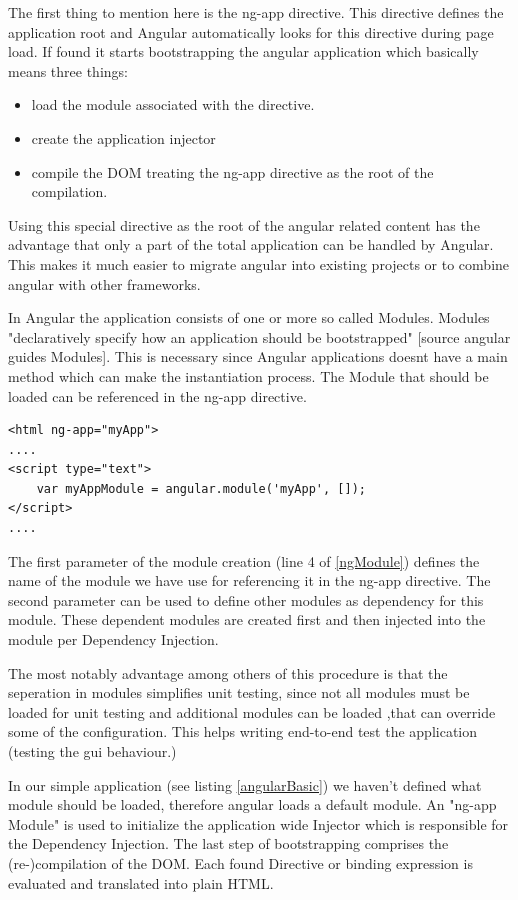 The first thing to mention here is the ng-app directive. This directive defines the application root and Angular automatically looks for this directive during page load. If found it starts bootstrapping the angular application which basically means three things:
\begin{itemize}
	\item load the module associated with the directive.
	\item create the application injector
	\item compile the DOM treating the ng-app directive as the root of the compilation. 
\end{itemize}

Using this special directive as the root of the angular related content has the advantage that only a part of the total application can be handled by Angular. This makes it much easier to migrate angular into existing projects or to combine angular with other frameworks.

In Angular the application consists of one or more so called Modules. Modules "declaratively specify how an application should be bootstrapped" [source angular guides Modules]. This is necessary since Angular applications doesnt have a main method which can make the instantiation process. The Module that should be loaded can be referenced in the ng-app directive. 
\begin{lstlisting}[label=ngModule]
<html ng-app="myApp">
....
<script type="text">
	var myAppModule = angular.module('myApp', []);
</script>
....
\end{lstlisting}

The first parameter of the module creation (line 4 of \ref{ngModule}) defines the name of the module we have use for referencing it in the ng-app directive. The second parameter can be used to define other modules as dependency for this module. These dependent modules are created first and then injected into the module per Dependency Injection.


The most notably advantage among others of this procedure is that the seperation in modules simplifies unit testing, since not all modules must be loaded for unit testing and additional modules can be loaded ,that can override some of the configuration. This helps writing end-to-end test the application (testing the gui behaviour.) 


In our simple application (see listing \ref{angularBasic}) we haven't defined what module should be loaded, therefore angular loads a default module. An "ng-app Module" is used to initialize the application wide Injector which is responsible for the Dependency Injection. The last step of bootstrapping comprises the (re-)compilation of the DOM. Each found Directive or binding expression is evaluated and translated into plain HTML.


